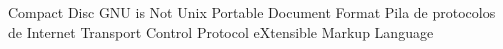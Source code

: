 

     {Compact Disc}
    {\acs{GNU} is Not Unix}
    {Portable Document Format}
 {Pila de protocolos de Internet}
    {Transport Control Protocol}
    {eXtensible Markup Language}
